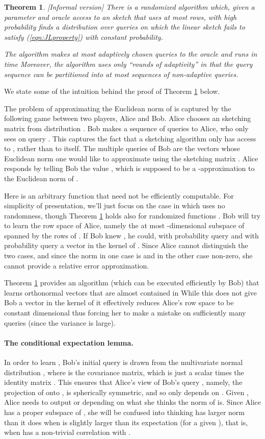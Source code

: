 \documentclass[11pt]{article}
\newtheorem{theorem}{Theorem}
\begin{document}
\begin{theorem}\label{thm:adaptive}[Informal version]
There is a randomized algorithm which, given a parameter  and
oracle access to an  sketch that uses at most 
rows, with high probability finds a distribution over queries on which 
the linear sketch fails to satisfy (\ref{eqn:JLproperty}) with constant probability.

The algorithm makes at most  adaptively chosen queries to the
oracle and runs in time  Moreover, the algorithm uses only 
``rounds of adaptivity'' in that the query sequence can be partitioned into at
most  sequences of non-adaptive queries.
\end{theorem}
We state some of the intuition behind the proof of Theorem \ref{thm:adaptive} below. 

The problem of approximating the Euclidean norm of  is captured 
by the following game between two
players, Alice and Bob. Alice chooses an  sketching matrix  from
distribution . Bob makes a sequence of queries  to
Alice, who only sees  on query . This captures the fact that a sketching
algorithm only has access to , rather than to  itself. The multiple
queries  of Bob are the vectors whose Euclidean norm one would like to approximate
using the sketching matrix . 
Alice responds by telling Bob the
value , which is supposed to be a -approximation to the Euclidean
norm of . 

Here  is an arbitrary function that 
need not be efficiently computable. For simplicity of presentation, we'll just focus
on the case in which  uses no randomness, though Theorem \ref{thm:adaptive}
holds also for randomized functions . 
Bob will try to learn the row space  of Alice, namely the at most
-dimensional subspace of  spanned by the rows of .  If Bob
knew , he could, with probability  query  and with probability
 query a vector in the kernel of . Since Alice cannot distinguish the
two cases, and since the norm in one case is  and in the other case
non-zero, she cannot provide a relative error approximation. 

Theorem \ref{thm:adaptive} provides 
an algorithm (which can be executed efficiently by Bob) that learns
 orthonormal vectors that are almost contained in  While this
does not give Bob a vector in the kernel of  it effectively reduces
Alice's row space to be constant dimensional thus forcing her to make a
mistake on sufficiently many queries (since the variance is large). 

\paragraph{The conditional expectation lemma.}
In order to learn , Bob's initial query is drawn from the multivariate
normal distribution , where  is the covariance
matrix, which is just a scalar  times the identity matrix .  This
ensures that Alice's view of Bob's query , namely, the projection  of
 onto , is spherically symmetric, and so only depends on
. Given , Alice needs to output  or  depending
on what she thinks the norm of  is. Since Alice has a
proper subspace of , she will be confused into thinking  has
larger norm than it does when  is slightly larger than its
expectation (for a given ), that is, when  has a non-trivial
correlation with . 
\end{document}
